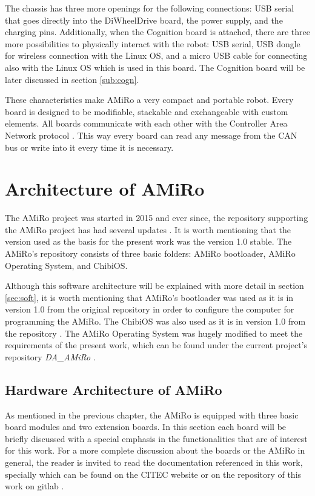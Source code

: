 \documentclass[12pt]{report}%
\begin{document}
The chassis has three more openings for the following connections: USB serial that goes directly into the DiWheelDrive board, the power supply, and the charging pins. Additionally, when the Cognition board is attached, there are three more possibilities to physically interact with the robot: USB serial, USB dongle for wireless connection with the Linux OS, and a micro USB cable for connecting also with the Linux OS which is used in this board. The Cognition board will be later discussed in section \ref{sub:cogn}.

These characteristics make AMiRo a very compact and portable robot. Every board is designed to be modifiable, stackable and exchangeable with custom elements. All boards communicate with each other with the Controller Area Network protocol \cite{AMiRo_paper_modular}. This way every board can read any message from the CAN bus or write into it every time it is necessary.

\chapter{Architecture of AMiRo}
The AMiRo project was started in 2015 and ever since, the repository supporting the AMiRo project has had several updates \cite{AMiRo_Wiki}. It is worth mentioning that the version used as the basis for the present work was the version 1.0 stable. The AMiRo's repository consists of three basic folders: AMiRo bootloader, AMiRo Operating System, and ChibiOS.

Although this software architecture will be explained with more detail in section \ref{sec:soft}, it is worth mentioning that AMiRo's bootloader was used as it is in version 1.0 from the original repository in order to configure the computer for programming the AMiRo. The ChibiOS was also used as it is in version 1.0 from the repository \cite{AMiRo_Wiki}. The AMiRo Operating System was hugely modified to meet the requirements of the present work, which can be found under the current project's repository \textit{DA\_AMiRo} \cite{AMiRo_Git}.

\section{Hardware Architecture of AMiRo}
As mentioned in the previous chapter, the AMiRo is equipped with three basic board modules and two extension boards. In this section each board will be briefly discussed with a special emphasis in the functionalities that are of interest for this work. For a more complete discussion about the boards or the AMiRo in general, the reader is invited to read the documentation referenced in this work, specially \cite{AMiRo_paper_verstaile, AMiRo_paper_modular, AMiRo_paper_applications, AMiRo_ppt_v1, AMiRo_ppt_v2} which can be found on the CITEC website or on the repository of this work on gitlab \cite{AMiRo_Git}.
\end{document}
